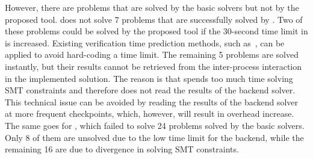 However, there are problems that are solved by the basic solvers but not by the proposed tool. \ringenCICI{\cvc{}} does not solve 7 problems that are successfully solved by \ringen{\cvc{}}. Two of these problems could be solved by the proposed tool if the 30-second time limit in \theringenCICI{} is increased. Existing verification time prediction methods, such as~\cite{10.1145/3121257.3121262}, can be applied to avoid hard-coding a time limit. The remaining 5 problems are solved instantly, but their results cannot be retrieved from the inter-process interaction in the implemented solution. The reason is that \racer{} spends too much time solving SMT constraints and therefore does not read the results of the backend solver. This technical issue can be avoided by reading the results of the backend solver at more frequent checkpoints, which, however, will result in overhead increase. The same goes for \ringenCICI{\vampire{}}, which failed to solve 24 problems solved by the basic solvers. Only 8 of them are unsolved due to the low time limit for the backend, while the remaining 16 are due to \racer{} divergence in solving SMT constraints.

